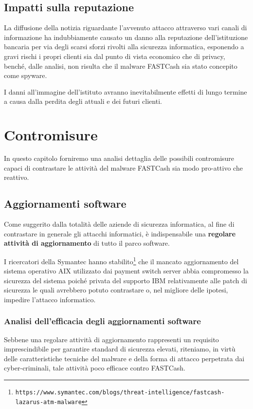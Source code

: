 \documentclass[10pt,a4paper, titlepage]{report}
\begin{document}
\section{Impatti sulla reputazione}

La diffusione della notizia riguardante l'avvenuto attacco attraverso vari canali di informazione ha indubbiamente causato un danno alla reputazione dell'istituzione bancaria per via degli scarsi sforzi rivolti alla sicurezza informatica, esponendo a gravi rischi i propri clienti sia dal punto di vista economico che di privacy, benché, dalle analisi, non risulta che il malware FASTCash sia stato concepito come spyware.

I danni all'immagine dell'istituto avranno inevitabilmente effetti di lungo termine a causa dalla perdita degli attuali e dei futuri clienti.

\newpage
\chapter{Contromisure}

In questo capitolo forniremo una analisi dettaglia delle possibili contromisure capaci di contrastare le attività del malware FASTCash sia modo pro-attivo che reattivo.

\section{Aggiornamenti software}

Come suggerito dalla totalità delle aziende di sicurezza informatica, al fine di contrastare in generale gli attacchi informatici, è indispensabile una \textbf{regolare attività di aggiornamento} di tutto il parco software.

I ricercatori della Symantec hanno stabilito\footnote{\texttt{https://www.symantec.com/blogs/threat-intelligence/fastcash-lazarus-atm-malware}} che il mancato aggiornamento del sistema operativo AIX utilizzato dai payment switch server abbia compromesso la sicurezza del sistema poiché privata del supporto IBM relativamente alle patch di sicurezza le quali avrebbero potuto contrastare o, nel migliore delle ipotesi, impedire l'attacco informatico. 

\subsection{Analisi dell'efficacia degli aggiornamenti software}

Sebbene una regolare attività di aggiornamento rappresenti un requisito imprescindibile per garantire standard di sicurezza elevati, riteniamo, in virtù delle caratteristiche tecniche del malware e della forma di attacco perpetrata dai cyber-criminali, tale attività poco efficace contro FASTCash.
 
\end{document}
